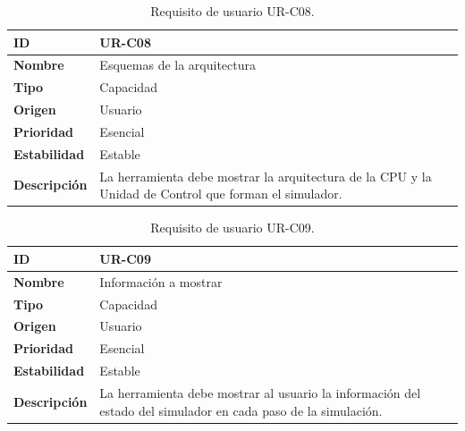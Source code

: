 \begin{center}
\begin{table}[htbp]
\centering
\begin{tabular}{@{}p{2.5cm} p{9cm}@{}} 
\toprule
\textbf{ID} 				& UR-C08 \\
\midrule
\textbf{Nombre} 			& Esquemas de la arquitectura \\
\midrule
\textbf{Tipo} 			& Capacidad \\
\midrule
\textbf{Origen} 			& Usuario \\
\midrule
\textbf{Prioridad}		& Esencial \\
\midrule
\textbf{Estabilidad} 		& Estable \\
\midrule
\textbf{Descripción} 	& La herramienta debe mostrar la arquitectura de la CPU y la Unidad de Control que forman el simulador. \\
\bottomrule
\end{tabular}
\caption{Requisito de usuario UR-C08.}
\label{tab:urc08}
\end{table}
\end{center}

\begin{center}
\begin{table}[htbp]
\centering
\begin{tabular}{@{}p{2.5cm} p{9cm}@{}} 
\toprule
\textbf{ID} 				& UR-C09 \\
\midrule
\textbf{Nombre} 			& Información a mostrar \\
\midrule
\textbf{Tipo} 			& Capacidad \\
\midrule
\textbf{Origen} 			& Usuario \\
\midrule
\textbf{Prioridad}		& Esencial \\
\midrule
\textbf{Estabilidad} 		& Estable \\
\midrule
\textbf{Descripción} 	& La herramienta debe mostrar al usuario la información del estado del simulador en cada paso de la simulación. \\
\bottomrule
\end{tabular}
\caption{Requisito de usuario UR-C09.}
\label{tab:urc09}
\end{table}
\end{center}


